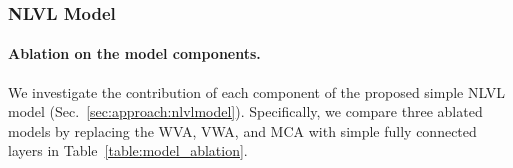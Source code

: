 



\vspace{-0.5em}\subsubsection{NLVL Model}
\label{sec:nlvl_model}

\vspace{-0.5em}\paragraph{Ablation on the model components.}
We investigate the contribution of each component of the proposed simple NLVL model (Sec.~\ref{sec:approach:nlvlmodel}).
Specifically, we compare three ablated models by replacing the WVA, VWA, and MCA with simple fully connected layers in Table~\ref{table:model_ablation}.

